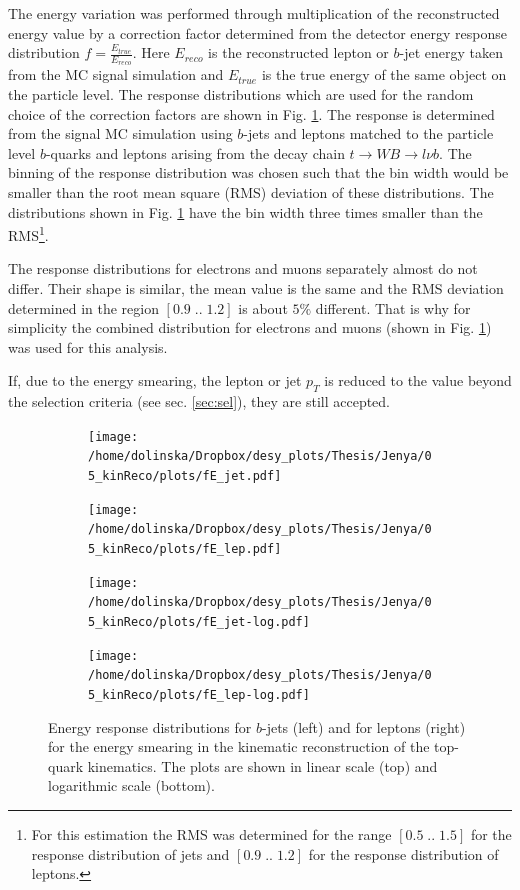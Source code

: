 The energy variation was performed through multiplication of the reconstructed energy value
by a correction factor determined from the detector energy response distribution $f = \frac{E_{true}}{E_{reco}}$. Here $E_{reco}$ is the reconstructed lepton 
or $b$-jet energy taken from the MC signal simulation and $E_{true}$ is the true energy of the same object on the particle level. The response distributions 
which are used for the random choice of the correction factors are shown in Fig. \ref{fig:fE}. The response is determined from 
the signal MC simulation using $b$-jets and leptons matched to the particle level $b$-quarks and leptons arising from the decay chain 
$t \rightarrow WB \rightarrow l\nu b$. The binning of the response distribution was chosen such that the bin width would be smaller than the 
root mean square (RMS) deviation of these distributions. The distributions shown in Fig. \ref{fig:fE} have the bin width three times
smaller than the RMS\footnote{For this estimation the RMS was determined for the range $[0.5\;..\;1.5]$ for the response distribution
of jets and $[0.9\;..\;1.2]$ for the response distribution of leptons.}.

The response distributions for electrons and muons separately almost do not differ. Their shape is similar, the mean value is the same and 
the RMS deviation determined in the region $[0.9\;..\;1.2]$ is about $5\%$ different. That is why for simplicity the combined distribution
for electrons and muons (shown in Fig. \ref{fig:fE}) was used for this analysis.

If, due to the energy smearing, the lepton or jet $p_{T}$ is reduced to the value beyond the selection criteria (see sec. \ref{sec:sel}), they are still accepted.

\begin{figure}[h]
\centering
\begin{subfigure}
  \centering
  \texttt{[image: /home/dolinska/Dropbox/desy\_plots/Thesis/Jenya/05\_kinReco/plots/fE\_jet.pdf]}
\end{subfigure}
\begin{subfigure}
  \centering
  \texttt{[image: /home/dolinska/Dropbox/desy\_plots/Thesis/Jenya/05\_kinReco/plots/fE\_lep.pdf]}
\end{subfigure}
\begin{subfigure}
  \centering
  \texttt{[image: /home/dolinska/Dropbox/desy\_plots/Thesis/Jenya/05\_kinReco/plots/fE\_jet-log.pdf]}
\end{subfigure}
\begin{subfigure}
  \centering
  \texttt{[image: /home/dolinska/Dropbox/desy\_plots/Thesis/Jenya/05\_kinReco/plots/fE\_lep-log.pdf]}
\end{subfigure}
\caption{Energy response distributions for $b$-jets (left) and for leptons (right) for the energy smearing in the kinematic
reconstruction of the top-quark kinematics. The plots are shown in linear scale (top) and logarithmic scale (bottom).}
\label{fig:fE}
\end{figure}

